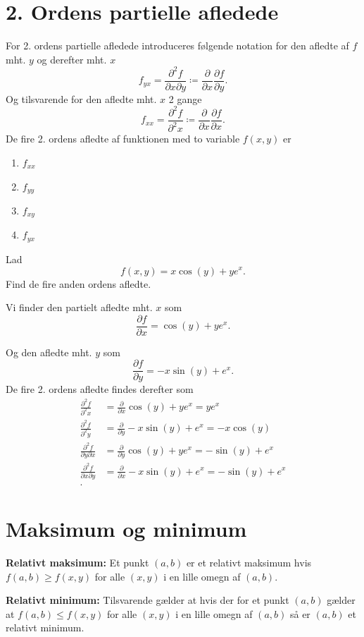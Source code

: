 \section{2. Ordens partielle afledede}
For 2. ordens partielle afledede introduceres følgende notation for den afledte af $f$ mht. $y$ og derefter mht. $x$
\[ 
f_{yx} = \frac{\partial^2 f}{\partial x \partial y} \coloneq \frac{\partial }{\partial x} \frac{\partial f}{\partial y}
.\]
Og tilsvarende for den afledte mht. $x$ 2 gange
\[ 
f_{x x} = \frac{\partial^2 f}{\partial^2 x} \coloneq \frac{\partial }{\partial x} \frac{\partial f}{\partial x}
.\]
De fire 2. ordens afledte af funktionen med to variable $f(x, y)$ er
\begin{enumerate}
  \item $f_{x x}$
  \item $f_{y y}$
  \item $f_{x y}$
  \item $f_{yx}$
\end{enumerate}

\begin{eks}
  Lad
  \[ 
  f(x,y) = x \cos(y) + ye^{x}
  .\]
  Find de fire anden ordens afledte.
  
  Vi finder den partielt afledte mht. $x$ som
  \[ 
  \frac{\partial f}{\partial x} = \cos(y) + ye^{x}
  .\]

  Og den afledte mht. $y$ som
  \[ 
  \frac{\partial f}{\partial y} = -x\sin(y) + e^{x}
  .\]
  De fire 2. ordens afledte findes derefter som
  \begin{align*}
    \frac{\partial^2 f}{\partial^2 x} &= \frac{\partial }{\partial x} \cos(y) + ye^{x} = ye^{x}  \\
    \frac{\partial^2 f}{\partial^2 y} &= \frac{\partial }{\partial y} -x \sin(y) + e^{x} = -x \cos(y)  \\
    \frac{\partial^2 f}{\partial y \partial x} &= \frac{\partial }{\partial y} \cos(y) + ye^{x} = -\sin(y) + e^{x}  \\
    \frac{\partial^2 f}{\partial x \partial y} &= \frac{\partial}{\partial x} -x \sin(y) + e^{x} = -\sin(y) + e^{x} \\
  .\end{align*}
\end{eks}

\section{Maksimum og minimum}
\begin{sæt} \label{sæt:1}
  \textbf{Relativt maksimum:} Et punkt $(a,b)$ er et relativt maksimum hvis $f(a,b) \geq f(x,y)$ for alle $(x,y)$ i en lille omegn af $(a,b)$.

  \textbf{Relativt minimum:} Tilsvarende gælder at hvis der for et punkt $(a,b)$ gælder at $f(a,b) \leq f(x,y)$ for alle $(x,y)$ i en lille omegn af $(a,b)$ så er $(a,b)$ et relativt minimum.
\end{sæt}


